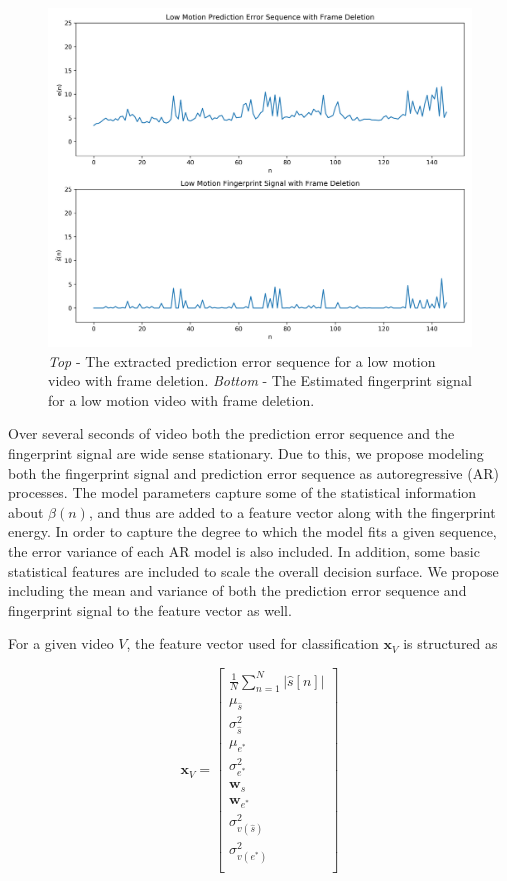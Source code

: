 \begin{figure}[htbp]
\centerline{\includegraphics[width=0.75\linewidth]{ProposedApproach/perror_fdel_comparison.png}}
\caption{\emph{Top} - The extracted prediction error sequence for a low motion video with frame deletion. \emph{Bottom} - The Estimated fingerprint signal for a low motion video with frame deletion.}
\label{fdelCompare}
\end{figure}

Over several seconds of video both the prediction error sequence and the fingerprint signal are wide sense stationary. Due to this, we propose modeling both the fingerprint signal and prediction error sequence as autoregressive (AR) processes. The model parameters capture some of the statistical information about $\beta(n)$, and thus are added to a feature vector along with the fingerprint energy. In order to capture the degree to which the model fits a given sequence, the error variance of each AR model is also included. In addition, some basic statistical features are included to scale the overall decision surface. We propose including the mean and variance of both the prediction error sequence and fingerprint signal to the feature vector as well.

For a given video $V$, the feature vector used for classification $\bm{x}_{V}$ is structured as

\begin{equation}
  \bm{x}_{V} = \begin{bmatrix}
    \frac{1}{N} \sum_{n=1}^{N} \vert \hat{s}[n] \vert \\
    \mu_{\hat{s}} \\
    \sigma_{\hat{s}}^{2} \\
    \mu_{e^{*}} \\
    \sigma_{e^{*}}^{2} \\
    \bm{w}_{\hat{s}} \\
    \bm{w}_{e^{*}} \\
    \sigma_{v(\hat{s})}^{2} \\
    \sigma_{v(e^{*})}^{2} \\
  \end{bmatrix}
\end{equation}

